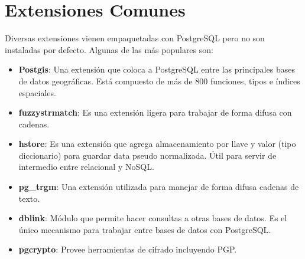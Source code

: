 \section{Extensiones Comunes}

Diversas extensiones vienen empaquetadas con PostgreSQL pero no son instaladas por defecto. Algunas de las más populares son:\\

\begin{itemize}
\item \textbf{Postgis}: Una extensión que coloca a PostgreSQL entre las principales bases de datos geográficas. Está compuesto de más de 800 funciones, tipos e índices espaciales.
\item \textbf{fuzzystrmatch}: Es una extensión ligera para trabajar de forma difusa con cadenas.
\item \textbf{hstore}: Es una extensión que agrega almacenamiento por llave y valor (tipo diccionario) para guardar data pseudo normalizada. Útil para servir de intermedio entre relacional y NoSQL.
\item \textbf{pg\_trgm}: Una extensión utilizada para manejar de forma difusa cadenas de texto.
\item \textbf{dblink}: Módulo que permite hacer consultas a otras bases de datos. Es el único mecanismo para trabajar entre bases de datos con PostgreSQL.
\item \textbf{pgcrypto}: Provee herramientas de cifrado incluyendo PGP. 
\end{itemize}

